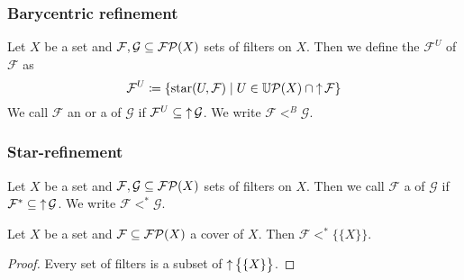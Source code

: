 \subsubsection{Barycentric refinement}
\begin{definition}
Let $X$ be a set and $\mathcal{F},\mathcal{G} \subseteq \operatorname{\mathcal{FP}}(X)$ sets of filters on $X$.
Then we define the  $\mathcal{F}^U$ of $\mathcal{F}$ as
\[ \mathcal{F}^U \coloneqq \left\{ \operatorname{star}(U, \mathcal{F}) \;\middle|\; U\in \operatorname{\mathbb{U}\mathcal{P}}(X) \cap \operatorname{\uparrow}\mathcal{F} \right\} \]
We call $\mathcal{F}$ an  or a  of $\mathcal{G}$ if $\mathcal{F}^U \subseteq \operatorname{\uparrow} \mathcal{G}$.
We write $\mathcal{F} <^B \mathcal{G}$.
\end{definition}

\subsubsection{Star-refinement}
\begin{definition}
Let $X$ be a set and $\mathcal{F},\mathcal{G} \subseteq \operatorname{\mathcal{FP}}(X)$ sets of filters on $X$. Then we call $\mathcal{F}$ a  of $\mathcal{G}$ if $\mathcal{F}^* \subseteq \operatorname{\uparrow} \mathcal{G}$. We write $\mathcal{F} <^* \mathcal{G}$.
\end{definition}

\begin{lemma}
Let $X$ be a set and $\mathcal{F}\subseteq \operatorname{\mathcal{FP}}(X)$ a cover of $X$. Then $\mathcal{F} <^* \big\{\{X\}\big\}$.
\end{lemma}
\begin{proof}
Every set of filters is a subset of $\operatorname{\uparrow} \big\{\{X\}\big\}$.
\end{proof}

